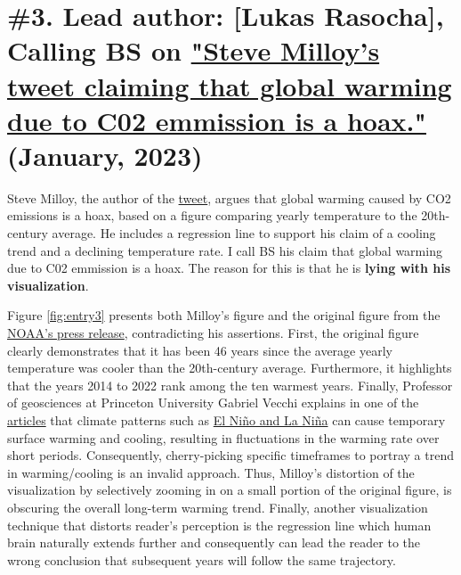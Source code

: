 \documentclass[fleqn,12pt]{article}
\begin{document}
\newpage

\section{\#3. Lead author: [Lukas Rasocha], Calling BS on \href{https://twitter.com/JunkScience/status/1613724250011242497?s=20}{"Steve Milloy's tweet claiming that global warming due to C02 emmission is a hoax."} (January, 2023)} 

Steve Milloy, the author of the \href{https://twitter.com/JunkScience/status/1613724250011242497?s=20}{tweet}, argues that global warming caused by CO2 emissions is a hoax, 
based on a figure comparing yearly temperature to the 20th-century average. He includes a regression line to support his claim of a cooling trend and a declining temperature rate.
I call BS his claim that global warming due to C02 emmission is a hoax. The reason for this is that he is \textbf{lying with his visualization}. 

Figure \ref{fig:entry3} presents both Milloy's figure and the original figure from the \href{https://www.noaa.gov/news/2022-was-worlds-6th-warmest-year-on-record}{NOAA's press release}, 
contradicting his assertions. First, the original figure clearly demonstrates that it has been 46 years since the average yearly temperature was cooler than the 20th-century average. 
Furthermore, it highlights that the years 2014 to 2022 rank among the ten warmest years. Finally, Professor of geosciences at Princeton University Gabriel Vecchi explains in one of the \href{https://www.factcheck.org/2023/01/scicheck-viral-tweet-misrepresents-noaa-report-on-rising-global-temperature/}{articles} 
that climate patterns such as \href{https://oceanservice.noaa.gov/facts/ninonina.html}{El Niño and La Niña} can cause temporary surface warming and cooling, resulting in fluctuations in the warming rate over short periods. 
Consequently, cherry-picking specific timeframes to portray a trend in warming/cooling is an invalid approach. Thus, Milloy's distortion of the visualization by selectively zooming in on a small portion of the original figure, is obscuring 
the overall long-term warming trend. Finally, another visualization technique that distorts reader's perception is the regression line which human brain naturally extends further and consequently can lead the reader to the wrong conclusion that 
subsequent years will follow the same trajectory. 
\end{document}
